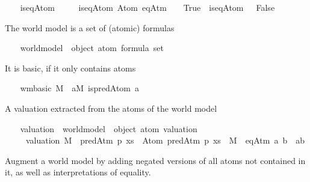 \begin{isabellebody}
\isanewline
\ \ \isamarkupfalse%
\ is{\isacharunderscore}{\kern0pt}eqAtom\ \isanewline
\ \ \ \ {\isachardoublequoteopen}is{\isacharunderscore}{\kern0pt}eqAtom\ {\isacharparenleft}{\kern0pt}Atom\ {\isacharparenleft}{\kern0pt}eqAtm\ {\isacharunderscore}{\kern0pt}\ {\isacharunderscore}{\kern0pt}{\isacharparenright}{\kern0pt}{\isacharparenright}{\kern0pt}\ {\isacharequal}{\kern0pt}\ True{\isachardoublequoteclose}\ {\isacharbar}{\kern0pt}\ {\isachardoublequoteopen}is{\isacharunderscore}{\kern0pt}eqAtom\ {\isacharunderscore}{\kern0pt}\ {\isacharequal}{\kern0pt}\ False{\isachardoublequoteclose}%
\begin{isamarkuptext}%
The world model is a set of (atomic) formulas%
\end{isamarkuptext}\isamarkuptrue%
\ \ \isamarkupfalse%
\ world{\isacharunderscore}{\kern0pt}model\ {\isacharequal}{\kern0pt}\ {\isachardoublequoteopen}object\ atom\ formula\ set{\isachardoublequoteclose}%
\begin{isamarkuptext}%
It is basic, if it only contains atoms%
\end{isamarkuptext}\isamarkuptrue%
\ \ \isamarkupfalse%
\ {\isachardoublequoteopen}wm{\isacharunderscore}{\kern0pt}basic\ M\ {\isasymequiv}\ {\isasymforall}a{\isasymin}M{\isachardot}{\kern0pt}\ is{\isacharunderscore}{\kern0pt}predAtom\ a{\isachardoublequoteclose}%
\begin{isamarkuptext}%
A valuation extracted from the atoms of the world model%
\end{isamarkuptext}\isamarkuptrue%
\ \ \isamarkupfalse%
\ valuation\ {\isacharcolon}{\kern0pt}{\isacharcolon}{\kern0pt}\ {\isachardoublequoteopen}world{\isacharunderscore}{\kern0pt}model\ {\isasymRightarrow}\ object\ atom\ valuation{\isachardoublequoteclose}\isanewline
\ \ \ \ \ {\isachardoublequoteopen}valuation\ M\ {\isasymequiv}\ {\isasymlambda}predAtm\ p\ xs\ {\isasymRightarrow}\ Atom\ {\isacharparenleft}{\kern0pt}predAtm\ p\ xs{\isacharparenright}{\kern0pt}\ {\isasymin}\ M\ {\isacharbar}{\kern0pt}\ eqAtm\ a\ b\ {\isasymRightarrow}\ a{\isacharequal}{\kern0pt}b{\isachardoublequoteclose}%
\begin{isamarkuptext}%
Augment a world model by adding negated versions of all atoms
    not contained in it, as well as interpretations of equality.%
\end{isamarkuptext}\isamarkuptrue%
\ \ \isamarkupfalse%

\end{isabellebody}
